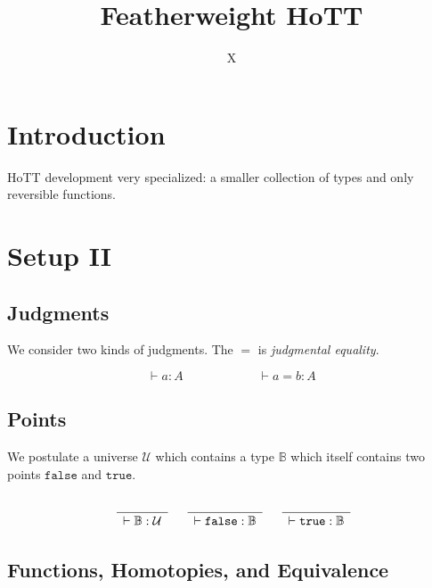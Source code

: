 \documentclass[format=acmlarge,review,natbib]{acmart}
\newcommand{\fc}{\mathtt{false}}
\newcommand{\tc}{\mathtt{true}}
\newcommand{\boolt}{\mathbb{B}}
\newcommand{\univ}{\mathcal{U}}
\newcommand{\Rule}[2]{
\makebox{
$\displaystyle
\frac{\begin{array}{l}#1\\\end{array}}
{\begin{array}{l}#2\\\end{array}}$}}
\newcommand{\proves}{\vdash}
\newcommand{\jdg}[3]{#1 \proves #2 : #3}
\begin{document}
\title{Featherweight HoTT}

\author{X}

\begin{abstract}
\end{abstract}

\maketitle

\section{Introduction}

HoTT development very specialized: a smaller collection of types and only
reversible functions.

\section{Setup II}

\subsection{Judgments}

We consider two kinds of judgments. The $=$ is \emph{judgmental equality}.

\[
\jdg{}{a}{A} \qquad\qquad\qquad \jdg{}{a = b}{A}
\]

\subsection{Points}

We postulate a universe $\univ$ which contains a type $\boolt$ which itself contains
two points $\fc$ and $\tc$.

\[\begin{array}{c}
\Rule{}{\jdg{}{\boolt}{\univ}}
\quad
\Rule{}{\jdg{}{\fc}{\boolt}}
\quad
\Rule{}{\jdg{}{\tc}{\boolt}}
\end{array}\]

\subsection{Functions, Homotopies, and Equivalence}
\end{document}
